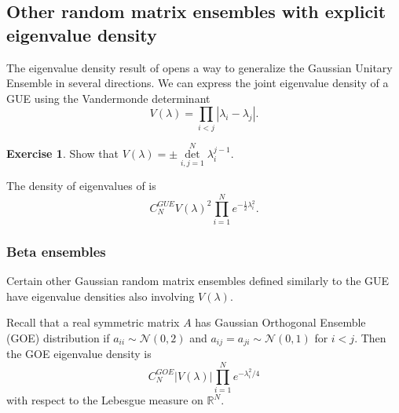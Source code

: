\documentclass[letterpaper,11pt,oneside,reqno]{amsart}
\numberwithin{equation}{section}
\newcommand{\Det}{\mathop{\mathrm{det}}\limits}
\theoremstyle{definition}
\newtheorem{exercise}[proposition]{Exercise}
\begin{document}

\subsection{Other random matrix ensembles with explicit eigenvalue density} %
\label{sub:other_gaussian_ensembles}

The eigenvalue density result of  opens a way to generalize the Gaussian
Unitary Ensemble in several directions.
We can express the joint eigenvalue density of a GUE using the Vandermonde determinant
\begin{equation*}
  V(\lambda)=\prod_{i<j} |\lambda_i-\lambda_j|.
\end{equation*}
\begin{exercise}
  Show that $V(\lambda)=\pm \Det_{i,j=1}^{N} \lambda_i^{j-1}.$
\end{exercise}
The density of eigenvalues of 
is 
\begin{equation*}
  C_N^{GUE} V(\lambda)^2 \prod_{i=1}^N e^{-\frac{1}{2}\lambda_i^2}.
\end{equation*}

\subsubsection{Beta ensembles} %
\label{ssub:beta_ensembles}

Certain other Gaussian random matrix ensembles 
defined similarly to the GUE
have eigenvalue densities also involving $V(\lambda)$.

Recall that a real symmetric matrix $A$ has 
Gaussian Orthogonal Ensemble (GOE) distribution 
if $a_{ii}\sim \mathcal{N}(0,2)$ and $a_{ij}=a_{ji}\sim \mathcal{N}(0,1)$ for $i<j$. Then the GOE eigenvalue density is 
\begin{equation*}
  C_N^{GOE} |V(\lambda)|\prod_{i=1}^N e^{-\lambda_i^2/4}
\end{equation*}
with respect to the Lebesgue measure on $\mathbb{R}^{N}$.
\end{document}
